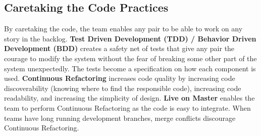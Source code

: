 \subsection{Caretaking the Code Practices}
By caretaking the code, the team enables any pair to be able to work on any story in the backlog.  \textbf{Test Driven Development (TDD) / Behavior Driven Development (BDD)} creates a safety net of tests that give any pair the courage to modify the system without the fear of breaking some other part of the system unexpectedly. The tests become a specification on how each component is used. \textbf{Continuous Refactoring} increases code quality by increasing code discoverability (knowing where to find the responsible code), increasing code readability, and increasing the simplicity of design.  \textbf{Live on Master} enables the team to perform Continuous Refactoring as the code is easy to integrate. When teams have long running development branches, merge conflicts discourage Continuous Refactoring. 





